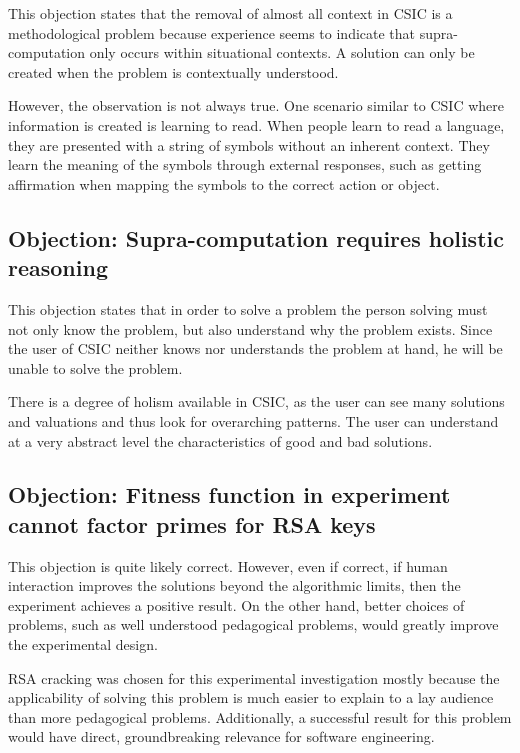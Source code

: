 This objection states that the removal of almost all context in CSIC is a methodological problem because experience seems to indicate that supra-computation only occurs within situational contexts.  A solution can only be created when the problem is contextually understood.

However, the observation is not always true.  One scenario similar to CSIC where information is created is learning to read.  When people learn to read a language, they are presented with a string of symbols without an inherent context.  They learn the meaning of the symbols through external responses, such as getting affirmation when mapping the symbols to the correct action or object.

\subsection{Objection: Supra-computation requires holistic \mbox{reasoning}}

This objection states that in order to solve a problem the person solving must not only know the problem, but also understand why the problem exists. Since the user of CSIC neither knows nor understands the problem at hand, he will be unable to solve the problem.

There is a degree of holism available in CSIC, as the user can see many solutions and valuations and thus look for overarching patterns. The user can understand at a very abstract level the characteristics of good and bad solutions.

\subsection{Objection: Fitness function in experiment cannot factor primes for RSA keys} 

This objection is quite likely correct.  However, even if correct, if human interaction improves the solutions beyond the algorithmic limits, then the experiment achieves a positive result.  On the other hand, better choices of problems, such as well understood pedagogical problems, would greatly improve the experimental design.  

RSA cracking was chosen for this experimental investigation mostly because the applicability of solving this problem is much easier to explain to a lay audience than more pedagogical problems.  Additionally, a successful result for this problem would have direct, groundbreaking relevance for software engineering.

